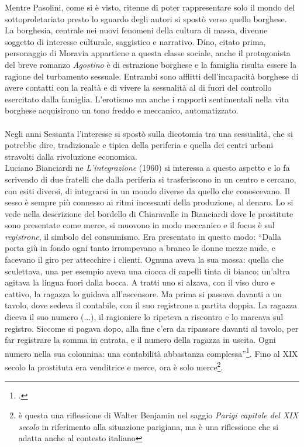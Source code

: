 Mentre Pasolini, come si è visto, ritenne di poter rappresentare solo il mondo del sottoproletariato presto lo sguardo degli autori si spostò verso quello borghese.
\\La borghesia, centrale nei nuovi fenomeni della cultura di massa, divenne soggetto di interesse culturale, saggistico e narrativo.
Dino, citato prima, personaggio di Moravia appartiene a questa classe sociale, anche il protagonista del breve romanzo \textit{Agostino} è di estrazione borghese e la famiglia risulta essere la ragione del turbamento sessuale.
Entrambi sono afflitti dell'incapacità borghese di avere contatti con la realtà e di vivere la sessualità al di fuori del controllo esercitato dalla famiglia.
L'erotismo ma anche i rapporti sentimentali nella vita borghese acquisirono un tono freddo e meccanico, automatizzato.

\paragraph{}Negli anni Sessanta l'interesse si spostò sulla dicotomia tra una sessualità, che si potrebbe dire, tradizionale e tipica della periferia e quella dei centri urbani stravolti dalla rivoluzione economica.
\\Luciano Bianciardi ne \textit{L'integrazione} (1960) si interessa a questo aspetto  e lo fa scrivendo di due fratelli che dalla periferia si trasferiscono in un centro e cercano, con esiti diversi, di integrarsi in un mondo diverse da quello che conoscevano.
Il sesso è sempre più connesso ai ritmi incessanti della produzione, al denaro.
Lo si vede nella descrizione del bordello di Chiaravalle in Bianciardi dove le prostitute sono presentate come merce, si muovono in modo meccanico e il focus è sul \textit{registrone}, il simbolo del consumismo.
Era presentato in questo modo: \enquote{Dalla porta giù in fondo ogni tanto irrompevano a branco le donne mezze nude, e facevano il giro per attecchire i clienti. Ognuna aveva la sua mossa: quella che sculettava, una per esempio aveva una ciocca di capelli tinta di bianco; un'altra agitava la lingua fuori dalla bocca. A tratti uno si alzava, con il viso duro e cattivo, la ragazza lo guidava all'ascensore. Ma prima si passava davanti a un tavolo, dove sedeva il contabile, con il suo registrone a partita doppia. La ragazza diceva il suo numero (...), il ragioniere lo ripeteva a riscontro e lo marcava sul registro. Siccome si pagava dopo, alla fine c'era da ripassare davanti al tavolo, per far registrare la somma in entrata, e il numero della ragazza in uscita. Ogni numero nella sua colonnina: una contabilità abbastanza complessa}\footcite{Bianciardi}.
Fino al XIX secolo la prostituta era venditrice e merce, ora è solo merce\footnote{è questa una riflessione di Walter Benjamin  nel saggio \textit{Parigi capitale del XIX secolo} in riferimento alla situazione parigiana, ma è una riflessione che si adatta anche al contesto italiano}.

